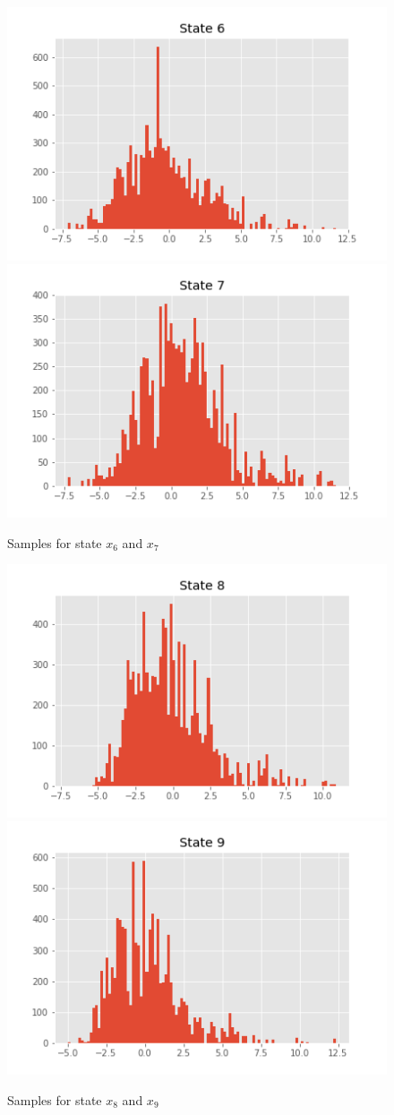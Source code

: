 \documentclass[]{article}
\begin{document}
	\begin{figure}[H]
		\begin{center}
			
			\includegraphics[width=.4\textwidth]{task2/figures/T_2_2/Q2/plt_x6.png}
			\includegraphics[width=.4\textwidth]{task2/figures/T_2_2/Q2/plt_x7.png}
			
			\caption*{Samples for state $x_6$ and $x_7$}
		\end{center}
	\end{figure}
	\begin{figure}[H]
		\begin{center}
			
			\includegraphics[width=.4\textwidth]{task2/figures/T_2_2/Q2/plt_x8.png}
			\includegraphics[width=.4\textwidth]{task2/figures/T_2_2/Q2/plt_x9.png}
			
			\caption*{Samples for state $x_8$ and $x_9$}
		\end{center}
	\end{figure}
\end{document}
